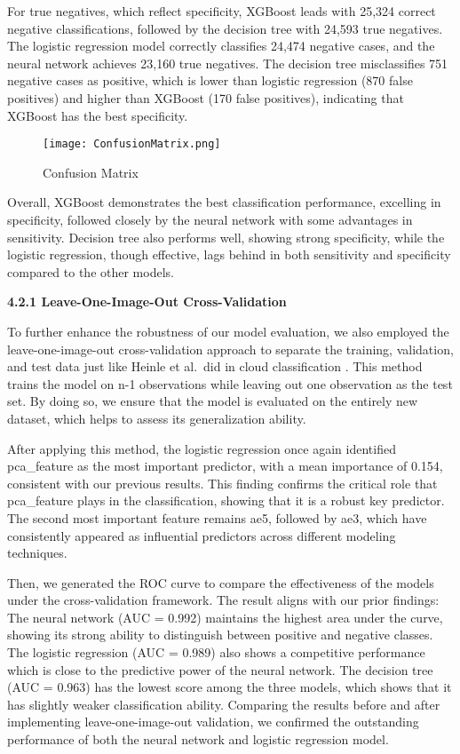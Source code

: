 \documentclass[10pt,letterpaper]{article}
\begin{document}
For true negatives, which reflect specificity, XGBoost leads with 25,324 correct negative classifications, followed by the decision tree with 24,593 true negatives. The logistic regression model correctly classifies 24,474 negative cases, and the neural network achieves 23,160 true negatives. The decision tree misclassifies 751 negative cases as positive, which is lower than logistic regression (870 false positives) and higher than XGBoost (170 false positives), indicating that XGBoost has the best specificity.

\begin{figure}[htbp]
    \centering
    \texttt{[image: ConfusionMatrix.png]}
    \caption{Confusion Matrix}
    \label{fig:enter-label}
\end{figure}

Overall, XGBoost demonstrates the best classification performance, excelling in specificity, followed closely by the neural network with some advantages in sensitivity. Decision tree also performs well, showing strong specificity, while the logistic regression, though effective, lags behind in both sensitivity and specificity compared to the other models.

\textbf{4.2.1 Leave-One-Image-Out Cross-Validation}

To further enhance the robustness of our model evaluation, we also employed the leave-one-image-out cross-validation approach to separate the training, validation, and test data just like Heinle et al.\ did in cloud classification \cite{heinle2010automatic}. This method trains the model on n-1 observations while leaving out one observation as the test set. By doing so, we ensure that the model is evaluated on the entirely new dataset, which helps to assess its generalization ability.

After applying this method, the logistic regression once again identified pca\_feature as the most important predictor, with a mean importance of 0.154, consistent with our previous results. This finding confirms the critical role that pca\_feature plays in the classification, showing that it is a robust key predictor. The second most important feature remains ae5, followed by ae3, which have consistently appeared as influential predictors across different modeling techniques.

Then, we generated the ROC curve to compare the effectiveness of the models under the cross-validation framework. The result aligns with our prior findings: The neural network (AUC = 0.992) maintains the highest area under the curve, showing its strong ability to distinguish between positive and negative classes. The logistic regression (AUC = 0.989) also shows a competitive performance which is close to the predictive power of the neural network. The decision tree (AUC = 0.963) has the lowest score among the three models, which shows that it has slightly weaker classification ability. Comparing the results before and after implementing leave-one-image-out validation, we confirmed the outstanding performance of both the neural network and logistic regression model.
\end{document}
